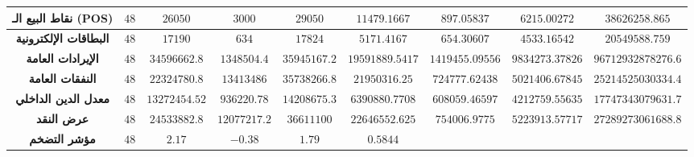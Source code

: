 \documentclass[10pt,a4paper]{report}
\begin{document}
\begin{doublespacing}
\begin{table}[H]
{\begin{tabular}{@{}|ccccccccc|@{}}
				\multicolumn{1}{|c|}{\textbf{نقاط البيع الـ (POS)}} &
				\multicolumn{1}{c|}{$48$} &
				\multicolumn{1}{c|}{$26050$} &
				\multicolumn{1}{c|}{$3000$} &
				\multicolumn{1}{c|}{$29050$} &
				\multicolumn{1}{c|}{$11479.1667$} &
				\multicolumn{1}{c|}{$897.05837$} &
				\multicolumn{1}{c|}{$6215.00272$} &
				$38626258.865$ \\ \midrule
				\multicolumn{1}{|c|}{\textbf{البطاقات الإلكترونية}} &
				\multicolumn{1}{c|}{$48$} &
				\multicolumn{1}{c|}{$17190$} &
				\multicolumn{1}{c|}{$634$} &
				\multicolumn{1}{c|}{$17824$} &
				\multicolumn{1}{c|}{$5171.4167$} &
				\multicolumn{1}{c|}{$654.30607$} &
				\multicolumn{1}{c|}{$4533.16542$} &
				$20549588.759$ \\ \midrule
				\multicolumn{1}{|c|}{\textbf{الإيرادات العامة}} &
				\multicolumn{1}{c|}{$48$} &
				\multicolumn{1}{c|}{$34596662.8$} &
				\multicolumn{1}{c|}{$1348504.4$} &
				\multicolumn{1}{c|}{$35945167.2$} &
				\multicolumn{1}{c|}{$19591889.5417$} &
				\multicolumn{1}{c|}{$1419455.09556$} &
				\multicolumn{1}{c|}{$9834273.37826$} &
				$96712932878276.6$ \\ \midrule
				\multicolumn{1}{|c|}{\textbf{النفقات العامة}} &
				\multicolumn{1}{c|}{$48$} &
				\multicolumn{1}{c|}{$22324780.8$} &
				\multicolumn{1}{c|}{$13413486$} &
				\multicolumn{1}{c|}{$35738266.8$} &
				\multicolumn{1}{c|}{$21950316.25$} &
				\multicolumn{1}{c|}{$724777.62438$} &
				\multicolumn{1}{c|}{$5021406.67845$} &
				$25214525030334.4$ \\ \midrule
				\multicolumn{1}{|c|}{\textbf{معدل الدين الداخلي}} &
				\multicolumn{1}{c|}{$48$} &
				\multicolumn{1}{c|}{$13272454.52$} &
				\multicolumn{1}{c|}{$936220.78$} &
				\multicolumn{1}{c|}{$14208675.3$} &
				\multicolumn{1}{c|}{$6390880.7708$} &
				\multicolumn{1}{c|}{$608059.46597$} &
				\multicolumn{1}{c|}{$4212759.55635$} &
				$17747343079631.7$ \\ \midrule
				\multicolumn{1}{|c|}{\textbf{عرض النقد}} &
				\multicolumn{1}{c|}{$48$} &
				\multicolumn{1}{c|}{$24533882.8$} &
				\multicolumn{1}{c|}{$12077217.2$} &
				\multicolumn{1}{c|}{$36611100$} &
				\multicolumn{1}{c|}{$22646552.625$} &
				\multicolumn{1}{c|}{$754006.9775$} &
				\multicolumn{1}{c|}{$5223913.57717$} &
				$27289273061688.8$ \\ \midrule
				\multicolumn{1}{|c|}{\textbf{مؤشر التضخم}} &
				\multicolumn{1}{c|}{$48$} &
				\multicolumn{1}{c|}{$2.17$} &
				\multicolumn{1}{c|}{$-0.38$} &
				\multicolumn{1}{c|}{$1.79$} &
				\multicolumn{1}{c|}{$0.5844$} &

\end{tabular}}
\end{table}
\end{doublespacing}
\end{document}
